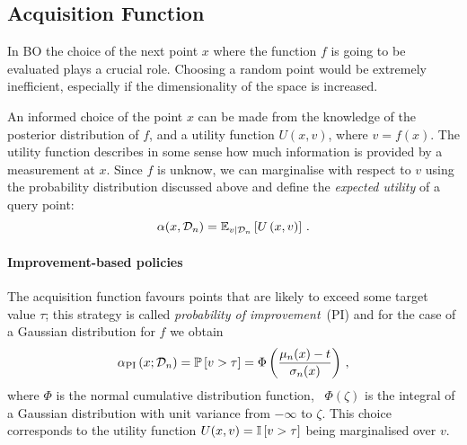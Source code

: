\subsection{Acquisition Function}
\label{sec:AcqFun}

In BO the choice of the next point $x$ where the function $f$ is going to be
evaluated plays a crucial role. Choosing a random point would be extremely
inefficient, especially if the dimensionality of the space is increased.

An informed choice of the point $x$ can be made from the knowledge of the
posterior distribution of $f$, and a utility function $U(x,v)$, where $v=f(x)$.
The utility function describes in some sense how much information is provided by
a measurement at $x$. Since $f$ is unknow, we can marginalise with respect to
$v$ using the probability distribution discussed above and define the {\em
expected utility} of a query point:
\begin{equation}
    \label{eq:ExpUtilDef}
    \alpha(x,\mathcal{D}_n) = \mathbb{E}_{v|\mathcal{D}_n}\left[U\left(x,v\right)\right]\, .
\end{equation}

\paragraph[]{Improvement-based policies}

The acquisition function favours points that are likely to exceed some target value $\tau$; this strategy is called {\em probability of improvement}\ (PI) and for the case of a Gaussian distribution for $f$ we obtain
\begin{equation}
    \label{eq:AlphaPI}
    \alpha_{\mathrm{PI}}\left(x;\mathcal{D}_n\right) =
    \mathbb{P}\left[v>\tau\right] =
    \Phi\left(
        \frac{\mu_n(x)-t}{\sigma_n(x)}
    \right)\, ,
\end{equation}
where $\Phi$ is the normal cumulative distribution function, \ie\ $\Phi(\zeta)$
is the integral of a Gaussian distribution with unit variance from $-\infty$ to
$\zeta$. This choice corresponds to the utility function
$U(x,v)=\mathbb{I}\left[v>\tau\right]$ being marginalised over $v$.

